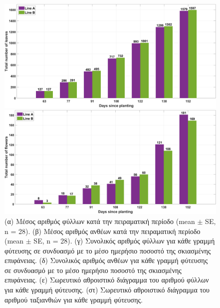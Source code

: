 \documentclass[12pt, a4paper]{report} %
\newcommand{\english}{\foreignlanguage{english}}
\begin{document}
\begin{figure}[H]
\begin{adjustwidth}{-0.5cm}{0cm}
        \begin{minipage}[c]{0.5\textwidth}
            \centering
            \includegraphics[scale=0.05]{leaves_flowers_e.jpg}
            \caption*{\hspace{35pt}(ε)}{}
        \end{minipage}
        \hfill
        \begin{minipage}[c]{0.5\textwidth}
            \centering
            \includegraphics[scale=0.05]{leaves_flowers_f.jpg}
            \caption*{\hspace{35pt}(στ)}{}
        \end{minipage}
    \end{adjustwidth}
        
    \caption{(α) Μέσος αριθμός φύλλων κατά την πειραματική περίοδο (\english{mean $\pm$ SE, n = 28}). 
    (β) Μέσος αριθμός ανθέων κατά την πειραματική περίοδο (\english{mean $\pm$ SE, n = 28}). (γ) 
    Συνολικός αριθμός φύλλων για κάθε γραμμή φύτευσης σε συνδυασμό με το μέσο ημερήσιο ποσοστό της σκιασμένης 
    επιφάνειας. (δ) Συνολικός αριθμός ανθέων για κάθε γραμμή φύτευσης σε συνδυασμό με το μέσο ημερήσιο 
    ποσοστό της σκιασμένης επιφάνειας. (ε) Σωρευτικό αθροιστικό διάγραμμα του αριθμού φύλλων για κάθε γραμμή 
    φύτευσης. (στ) Σωρευτικό αθροιστικό διάγραμμα του αριθμού ταξιανθιών για κάθε γραμμή φύτευσης.}
    \label{fig_leaves_flowers}
\end{figure}
\end{document}
